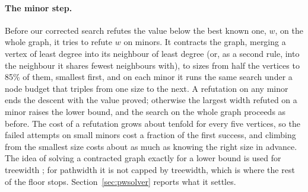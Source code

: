 \paragraph{The minor step.} Before our corrected search refutes the value
below the best known one, $w$, on the whole graph, it tries to refute $w$ on
minors. It contracts the graph, merging a vertex of least degree into its
neighbour of least degree (or, as a second rule, into the neighbour it shares
fewest neighbours with), to sizes from half the vertices to 85\% of them,
smallest first, and on each minor it runs the same search under a node budget
that triples from one size to the next. A refutation on any minor ends the
descent with the value proved; otherwise the largest width refuted on a minor
raises the lower bound, and the search on the whole graph proceeds as before.
The cost of a refutation grows about tenfold for every five vertices, so the
failed attempts on small minors cost a fraction of the first success, and
climbing from the smallest size costs about as much as knowing the right size
in advance. The idea of solving a contracted graph exactly for a lower bound
is used for treewidth \citep{BodlaenderWolleKoster2006,BodlaenderKoster2011};
for pathwidth it is not capped by treewidth, which is where the rest of the
floor stops. Section~\ref{sec:pwsolver} reports what it settles.
